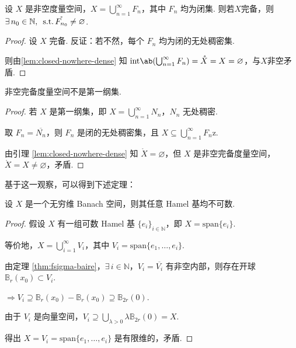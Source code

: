 \begin{theorem}
    设 $X$ 是非空度量空间，$X = \bigcup_{n=1}^\infty F_n$，其中 $F_n$ 均为闭集. 则若$X$完备，则$\exists\, n_0 \in \mathbb{N},\ \operatorname{\,\text{s.t.}} \mathring{F_{n_0}} \neq \varnothing$.
\end{theorem}
\begin{proof}
    设 $X$ 完备. 反证：若不然，每个 $F_n$ 均为闭的无处稠密集.\par
    则由\cref{lem:closed-nowhere-dense} 知 $\mathrm{int}\ab(\bigcup_{n=1}^\infty F_n)=\mathring{X}=X=\varnothing$，与$X$非空矛盾.
\end{proof}

\begin{lemma}[完备度量空间是第二纲集]\label{lem:second-category}
    非空完备度量空间不是第一纲集.
\end{lemma}
\begin{proof}
    若 $X$ 是第一纲集，即 $X = \bigcup_{n=1}^\infty N_n$，$N_n$ 无处稠密. \par
    取 $F_n = \overline{N_n}$，则 $F_n$ 是闭的无处稠密集，且 $X \subseteq \bigcup_{n=1}^\infty F_n$z.\par
    由引理 \ref{lem:closed-nowhere-dense} 知 $\mathring{X} = \varnothing$，但 $X$ 是非空完备度量空间，$\mathring{X} = X \neq \varnothing$，矛盾.
\end{proof}


基于这一观察，可以得到下述定理：

\begin{theorem}
    设 $X$ 是一个无穷维 Banach 空间，则其任意 Hamel 基均不可数.
\end{theorem}
\begin{proof}
    假设 $X$ 有一组可数 Hamel 基 $\{e_i\}_{i\in\mathbb{N}}$，即 $X = \mathrm{span}\{e_i\}$.\par
    等价地，$X = \bigcup_{i=1}^\infty V_i$，其中 $V_i = \mathrm{span}\{e_1, \dots, e_i\}$.\par
    由定理 \ref{thm:fsigma-baire}，$\exists\, i \in \mathbb{N}$，$V_i = \overline{V_i}$ 有非空内部，则存在开球 $\mathbb{B}_r(x_0) \subset V_i$.\par
    $\Rightarrow V_i \supseteq \mathbb{B}_r(x_0) - \mathbb{B}_r(x_0) \supseteq \mathbb{B}_{2r}(0)$.\par
    由于 $V_i$ 是向量空间，$V_i \supseteq \bigcup_{\lambda>0} \lambda \mathbb{B}_{2r}(0) = X$.\par
    得出 $X = V_i = \mathrm{span}\{e_1, \dots, e_i\}$ 是有限维的，矛盾.
\end{proof}

